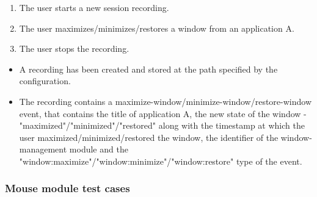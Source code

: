 \begin{tests}
	{\begin{enumerate}
		\item The user starts a new session recording.
		\item The user maximizes/minimizes/restores a window from an application A.
		\item The user stops the recording.
	\end{enumerate}}
	{\begin{itemize}
		\item A recording has been created and stored at the path specified by the configuration.
		\item The recording contains a maximize-window/minimize-window/restore-window event, that contains the title of application A, the new state of the window - "maximized"/"minimized"/"restored" along with the timestamp at which the user maximized/minimized/restored the window, the identifier of the window-management module and the "window:maximize"/"window:minimize"/"window:restore" type of the event.
	\end{itemize}}
\end{tests}

\subsubsection{Mouse module test cases}

